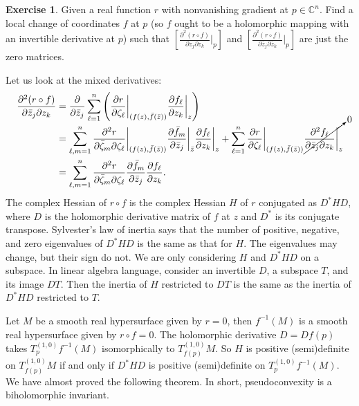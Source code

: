 \documentclass[12pt,openany]{book}
\newcommand{\C}{{\mathbb{C}}}
\theoremstyle{plain}
\theoremstyle{remark}
\theoremstyle{definition}
\newenvironment{exbox}{%
    \def\FrameCommand{\vrule width 1pt \relax\hspace{10pt}}%
    \MakeFramed {\advance \hsize -\width \FrameRestore}%
}{%
    \endMakeFramed
}
\theoremstyle{exercise}
\newtheorem{exercise}{Exercise}[section]
\theoremstyle{example}
\begin{document}
\begin{exbox}
\begin{exercise}
Given a real function $r$ with nonvanishing gradient at $p \in \C^n$.  Find
a local change of coordinates $f$ at $p$ (so $f$ ought to be a holomorphic
mapping with an invertible derivative at $p$) such that 
$\left[ \frac{\partial^2 (r \circ f)}{\partial z_j \partial z_k} \Big|_p \right]$
and
$\left[ \frac{\partial^2 (r \circ f)}{\partial \bar{z}_j \partial \bar{z}_k}
\Big|_p \right]$
are just the zero matrices.
\end{exercise}
\end{exbox}

Let us look at the mixed derivatives:
\begin{equation*}
\begin{split}
\frac{\partial^2 (r \circ f)}{\partial \bar{z}_j \partial z_k}
& =
\frac{\partial}{\partial \bar{z}_j }
\sum_{\ell=1}^n 
\left(
\frac{\partial r}{\partial \zeta_\ell} \bigg|_{(f(z),\bar{f}(\bar{z}))}
\frac{\partial f_\ell}{\partial z_k} \bigg|_z 
\right)
\\
& =
\sum_{\ell,m=1}^n 
\frac{\partial^2 r}{\partial \bar{\zeta}_m \partial \zeta_\ell }
\bigg|_{(f(z),\bar{f}(\bar{z}))}
\frac{\partial \bar{f}_m}{\partial \bar{z}_j} \bigg|_{\bar{z}} 
\frac{\partial f_\ell}{\partial z_k} \bigg|_z 
+
\sum_{\ell=1}^n 
\frac{\partial r}{\partial \zeta_\ell} \bigg|_{(f(z),\bar{f}(\bar{z}))}
\smash{\cancelto{0}{\frac{\partial^2 f_\ell}{\partial \bar{z}_j \partial z_k} \bigg|_z}}
\\
&=
\sum_{\ell,m=1}^n 
\frac{\partial^2 r}{\partial \bar{\zeta}_m \partial \zeta_\ell}
\frac{\partial \bar{f}_m}{\partial \bar{z}_j} 
\frac{\partial f_\ell}{\partial z_k} .
\end{split}
\end{equation*}
The complex Hessian of $r \circ f$ is the complex Hessian $H$ of $r$
conjugated as $D^*HD$, where $D$ is the holomorphic
derivative matrix of $f$ at $z$ and
$D^*$ is its conjugate transpose.  Sylvester's law of inertia 
says that the number of positive, negative, and zero
eigenvalues of $D^*HD$ is the same as that for $H$.  The
eigenvalues may change, but their sign do not.
We are only considering $H$ and $D^*HD$ on a subspace.  In linear algebra
language, consider an invertible $D$, a subspace $T$, and its image $DT$.
Then the inertia of $H$ restricted to $DT$ is the same
as the inertia of $D^*HD$ restricted to $T$.

Let $M$ be a smooth real hypersurface given by $r=0$, then $f^{-1}(M)$ is
a smooth real hypersurface given by $r \circ f = 0$.
The holomorphic derivative $D = Df(p)$ 
takes
$T_{p}^{(1,0)}f^{-1}(M)$ isomorphically to $T_{f(p)}^{(1,0)}M$.
So $H$ is positive (semi)definite
on $T_{f(p)}^{(1,0)}M$ if and only if $D^*HD$ is positive (semi)definite
on $T_{p}^{(1,0)} f^{-1}(M)$.
We have almost proved the following theorem.  In short, pseudoconvexity is a
biholomorphic invariant.
\end{document}
